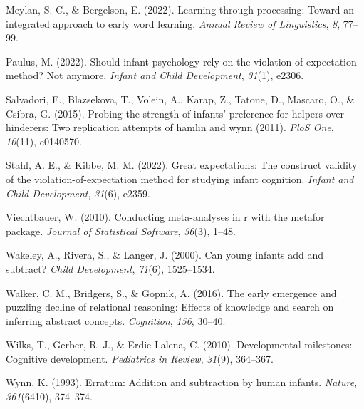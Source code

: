 \documentclass[10pt, letterpaper]{article}
\newenvironment{CSLReferences}%
  {}%
  {\par}
\begin{document}
\begin{CSLReferences}{1}{0}
\leavevmode{}%
Meylan, S. C., \& Bergelson, E. (2022). Learning through processing:
Toward an integrated approach to early word learning. \emph{Annual
Review of Linguistics}, \emph{8}, 77--99.

\leavevmode{}%
Paulus, M. (2022). Should infant psychology rely on the
violation-of-expectation method? Not anymore. \emph{Infant and Child
Development}, \emph{31}(1), e2306.

\leavevmode{}%
Salvadori, E., Blazsekova, T., Volein, A., Karap, Z., Tatone, D.,
Mascaro, O., \& Csibra, G. (2015). Probing the strength of infants'
preference for helpers over hinderers: Two replication attempts of
hamlin and wynn (2011). \emph{PloS One}, \emph{10}(11), e0140570.

\leavevmode{}%
Stahl, A. E., \& Kibbe, M. M. (2022). Great expectations: The construct
validity of the violation-of-expectation method for studying infant
cognition. \emph{Infant and Child Development}, \emph{31}(6), e2359.

\leavevmode{}%
Viechtbauer, W. (2010). Conducting meta-analyses in r with the metafor
package. \emph{Journal of Statistical Software}, \emph{36}(3), 1--48.

\leavevmode{}%
Wakeley, A., Rivera, S., \& Langer, J. (2000). Can young infants add and
subtract? \emph{Child Development}, \emph{71}(6), 1525--1534.

\leavevmode{}%
Walker, C. M., Bridgers, S., \& Gopnik, A. (2016). The early emergence
and puzzling decline of relational reasoning: Effects of knowledge and
search on inferring abstract concepts. \emph{Cognition}, \emph{156},
30--40.

\leavevmode{}%
Wilks, T., Gerber, R. J., \& Erdie-Lalena, C. (2010). Developmental
milestones: Cognitive development. \emph{Pediatrics in Review},
\emph{31}(9), 364--367.

\leavevmode{}%
Wynn, K. (1993). Erratum: Addition and subtraction by human infants.
\emph{Nature}, \emph{361}(6410), 374--374.

\end{CSLReferences}


\end{document}
